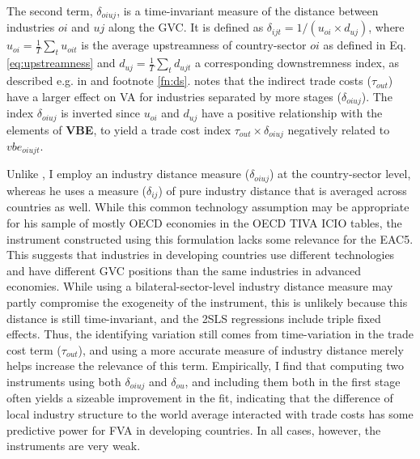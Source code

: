 \documentclass[a4paper]{article}
\begin{document}
The second term, $\delta_{oiuj}$, is a time-invariant measure of the distance between industries $oi$ and $uj$ along the GVC. It is defined as $\delta_{ijt} = 1/(u_{oi}\times d_{uj})$, where $u_{oi} = \frac{1}{T}\sum_t u_{oit}$ is the average upstreamness of country-sector $oi$ as defined in Eq. \ref{eq:upstreamness} and $d_{uj} = \frac{1}{T}\sum_t d_{ujt}$ a corresponding downstremness index, as described e.g. in \citet{antras2022global} and footnote \ref{fn:ds}. \citet{Kummritz20161} notes that the indirect trade costs ($\tau_{out}$) have a larger effect on VA for industries separated by more stages ($\delta_{oiuj}$). The index $\delta_{oiuj}$ is inverted since $u_{oi}$ and $d_{uj}$ have a positive relationship with the elements of \textbf{VBE}, to yield a trade cost index $\tau_{out}\times \delta_{oiuj}$ negatively related to $vbe_{oiujt}$. \newline 

Unlike \citet{Kummritz20161}, I employ an industry distance measure ($\delta_{oiuj}$) at the country-sector level, whereas he uses a measure ($\delta_{ij}$) of pure industry distance that is averaged across countries as well. While this common technology assumption may be appropriate for his sample of mostly OECD economies in the OECD TIVA ICIO tables, the instrument constructed using this formulation lacks some relevance for the EAC5. This suggests that industries in developing countries use different technologies and have different GVC positions than the same industries in advanced economies. While using a bilateral-sector-level industry distance measure may partly compromise the exogeneity of the instrument, this is unlikely because this distance is still time-invariant, and the 2SLS regressions include triple fixed effects. Thus, the identifying variation still comes from time-variation in the trade cost term ($\tau_{out}$), and using a more accurate measure of industry distance merely helps increase the relevance of this term. Empirically, I find that computing two instruments using both $\delta_{oiuj}$ and $\delta_{ou}$, and including them both in the first stage often yields a sizeable improvement in the fit, indicating that the difference of local industry structure to the world average interacted with trade costs has some predictive power for FVA in developing countries. In all cases, however, the instruments are very weak.  \newline 
\end{document}
